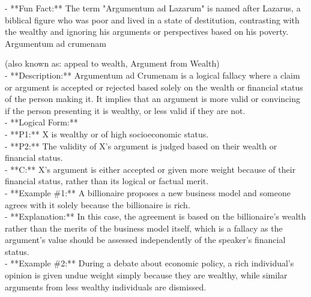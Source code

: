 \documentclass[a4paper,12pt,single,pdftex]{scrbook}
\begin{document}
    
      - **Fun Fact:** The term "Argumentum ad Lazarum" is named after Lazarus, a biblical figure who was poor and lived in a state of destitution, contrasting with the wealthy and ignoring his arguments or perspectives based on his poverty.
    \\

  

Argumentum ad crumenam
    
      (also known as: appeal to wealth, Argument from Wealth)
    \\

  
    
      - **Description:** Argumentum ad Crumenam is a logical fallacy where a claim or argument is accepted or rejected based solely on the wealth or financial status of the person making it. It implies that an argument is more valid or convincing if the person presenting it is wealthy, or less valid if they are not.
    \\

    
      - **Logical Form:**
    \\

    
        - **P1:** X is wealthy or of high socioeconomic status.
    \\

    
        - **P2:** The validity of X's argument is judged based on their wealth or financial status.
    \\

    
        - **C:** X’s argument is either accepted or given more weight because of their financial status, rather than its logical or factual merit.
    \\

    
      - **Example \#1:** A billionaire proposes a new business model and someone agrees with it solely because the billionaire is rich.
    \\

    
      - **Explanation:** In this case, the agreement is based on the billionaire’s wealth rather than the merits of the business model itself, which is a fallacy as the argument’s value should be assessed independently of the speaker’s financial status.
    \\

    
      - **Example \#2:** During a debate about economic policy, a rich individual’s opinion is given undue weight simply because they are wealthy, while similar arguments from less wealthy individuals are dismissed.
    \\
\end{document}
